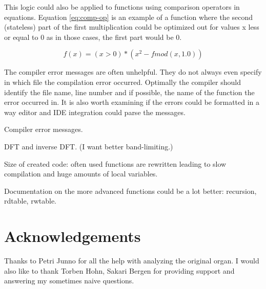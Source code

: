 \documentclass[11pt,a4paper]{article}
\begin{document}
This logic could also be applied to functions using comparison operators in equations. Equation \ref{eq:comp-op} is an example of a function where the second (stateless) part of the first multiplication could be optimized out for values x less or equal to 0 as in those cases, the first part would be 0.

\begin{equation}
\label{eq:comp-op}
f(x) = (x>0) * (x^2-fmod(x,1.0))
\end{equation}


The compiler error messages are often unhelpful. They do not always even specify in which file the compilation error occurred. Optimally the compiler should identify the file name, line number and if possible, the name of the function the error occurred in. It is also worth examining if the errors could be formatted in a way editor and IDE integration could parse the messages.

%
Compiler error messages.

DFT and inverse DFT. (I want better band-limiting.)

Size of created code: often used functions are rewritten leading to slow compilation and huge amounts of local variables.

Documentation on the more advanced functions could be a lot better: recursion, rdtable, rwtable.

\section{Acknowledgements}

Thanks to Petri Junno for all the help with analyzing the original organ. I would also like to thank Torben Hohn, Sakari Bergen for providing support and answering my sometimes naive questions. %




\end{document}
